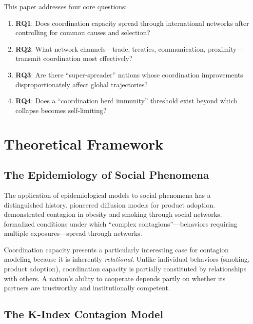 \documentclass[12pt,a4paper]{article}
\begin{document}
This paper addresses four core questions:

\begin{enumerate}
    \item \textbf{RQ1}: Does coordination capacity spread through international networks after controlling for common causes and selection?
    \item \textbf{RQ2}: What network channels---trade, treaties, communication, proximity---transmit coordination most effectively?
    \item \textbf{RQ3}: Are there ``super-spreader'' nations whose coordination improvements disproportionately affect global trajectories?
    \item \textbf{RQ4}: Does a ``coordination herd immunity'' threshold exist beyond which collapse becomes self-limiting?
\end{enumerate}

\section{Theoretical Framework}
\label{sec:theory}

\subsection{The Epidemiology of Social Phenomena}

The application of epidemiological models to social phenomena has a distinguished history. \citet{Bass1969} pioneered diffusion models for product adoption. \citet{Christakis2007} demonstrated contagion in obesity and smoking through social networks. \citet{Centola2018} formalized conditions under which ``complex contagions''---behaviors requiring multiple exposures---spread through networks.

Coordination capacity presents a particularly interesting case for contagion modeling because it is inherently \textit{relational}. Unlike individual behaviors (smoking, product adoption), coordination capacity is partially constituted by relationships with others. A nation's ability to cooperate depends partly on whether its partners are trustworthy and institutionally competent.

\subsection{The K-Index Contagion Model}
\end{document}

